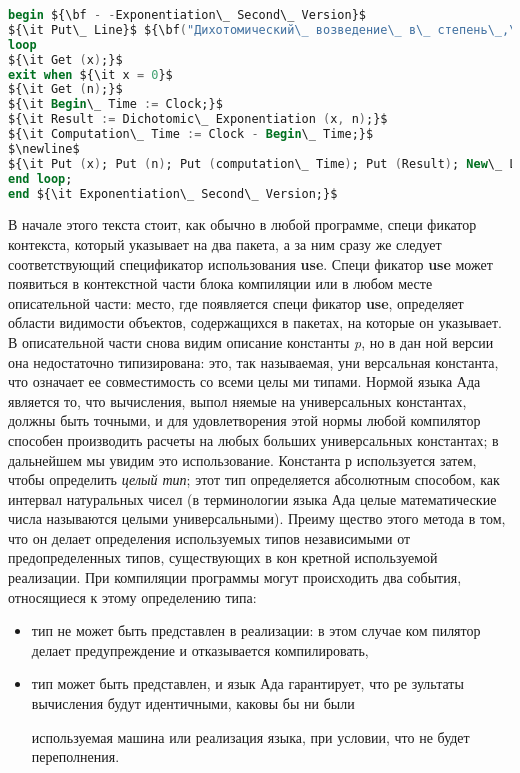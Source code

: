 \newpage
\begin{lstlisting}[mathescape=true, language=Ada, basicstyle=\small]
begin ${\bf - -Exponentiation\_ Second\_ Version}$
${\it Put\_ Line}$ ${\bf("Дихотомический\_ возведение\_ в\_ степень\_,\_ вторая\_ версия");}$
loop
${\it Get (x);}$
exit when ${\it x = 0}$
${\it Get (n);}$
${\it Begin\_ Time := Clock;}$
${\it Result := Dichotomic\_ Exponentiation (x, n);}$
${\it Computation\_ Time := Clock - Begin\_ Time;}$
$\newline$
${\it Put (x); Put (n); Put (computation\_ Time); Put (Result); New\_ Line;}$
end loop;
end ${\it Exponentiation\_ Second\_ Version;}$
\end{lstlisting}
В начале этого текста стоит, как обычно в любой программе, специ­
фикатор контекста, который указывает на два пакета, а за ним сразу
же следует соответствующий спецификатор использования {\bf use}. Специ­
фикатор {\bf use} может появиться в контекстной части блока компиляции
или в любом месте описательной части: место, где появляется специ­
фикатор {\bf use}, определяет области видимости объектов, содержащихся
в пакетах, на которые он указывает.
В описательной части снова видим описание константы {\it p}, но в дан­
ной версии она недостаточно типизирована: это, так называемая, уни­
версальная константа, что означает ее совместимость со всеми целы­
ми типами. Нормой языка Ада является то, что вычисления, выпол­
няемые на универсальных константах, должны быть точными, и для
удовлетворения этой нормы любой компилятор способен производить
расчеты на любых больших универсальных константах; в дальнейшем
мы увидим это использование. Константа р используется затем, чтобы
определить {\it целый тип}; этот тип определяется абсолютным способом,
как интервал натуральных чисел (в терминологии языка Ада целые
математические числа называются целыми универсальными). Преиму­
щество этого метода в том, что он делает определения используемых
типов независимыми от предопределенных типов, существующих в кон­
кретной используемой реализации. При компиляции программы могут
происходить два события, относящиеся к этому определению типа:
\begin{itemize}
\item тип не может быть представлен в реализации: в этом случае ком­
пилятор делает предупреждение и отказывается компилировать,
\item тип может быть представлен, и язык Ада гарантирует, что ре­
зультаты вычисления будут идентичными, каковы бы ни были
\newpage

используемая машина или реализация языка, при условии, что не
будет переполнения.
\end{itemize}
